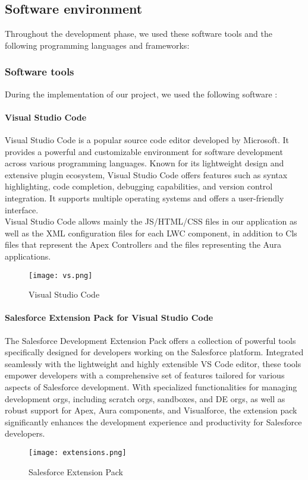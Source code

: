 \subsection{Software environment}
Throughout the development phase, we used these software tools
and the following programming languages and frameworks:
\subsubsection{Software tools}
During the implementation of our project, we used the following software :
\paragraph*{Visual Studio Code}
Visual Studio Code is a popular source code editor developed by Microsoft. It provides a powerful and customizable environment for software development across various programming languages. Known for its lightweight design and extensive plugin ecosystem, Visual Studio Code offers features such as syntax highlighting, code completion, debugging capabilities, and version control integration. It supports multiple operating systems and offers a user-friendly interface.\\
Visual Studio Code allows mainly the JS/HTML/CSS files in our application as well as the XML configuration files for each LWC component, in addition to Cls files that represent the Apex Controllers and the files representing the Aura applications.
\begin{figure}[H]%
    \center   
    \texttt{[image: vs.png]}
    \caption{Visual Studio Code}
\end{figure}
\paragraph*{Salesforce Extension Pack for Visual Studio Code}
The Salesforce Development Extension Pack offers a collection of powerful tools specifically designed for developers working on the Salesforce platform. Integrated seamlessly with the lightweight and highly extensible VS Code editor, these tools empower developers with a comprehensive set of features tailored for various aspects of Salesforce development. With specialized functionalities for managing development orgs, including scratch orgs, sandboxes, and DE orgs, as well as robust support for Apex, Aura components, and Visualforce, the extension pack significantly enhances the development experience and productivity for Salesforce developers.
\begin{figure}[H]%
    \center   
    \texttt{[image: extensions.png]}
    \caption{Salesforce Extension Pack }
\end{figure}
